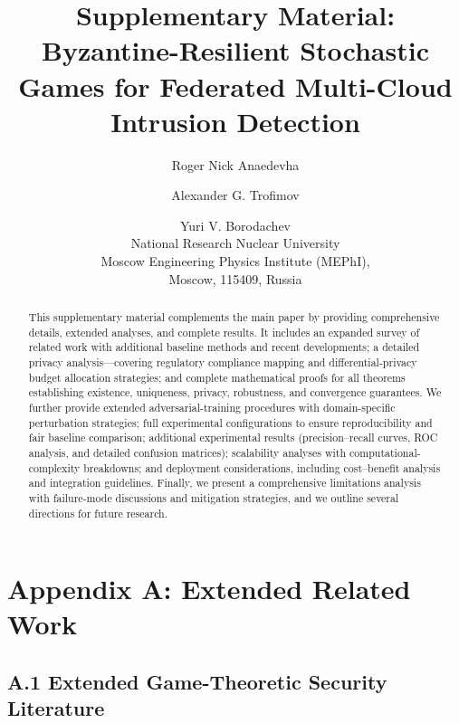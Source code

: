 \documentclass[12pt,a4paper]{article}
\theoremstyle{definition}
\begin{document}
\title{\textbf{Supplementary Material:\\Byzantine-Resilient Stochastic Games for Federated Multi-Cloud Intrusion Detection}}

\author{Roger Nick Anaedevha \and Alexander G. Trofimov \and Yuri V. Borodachev\\
\small National Research Nuclear University \\ 
\small Moscow Engineering Physics Institute (MEPhI), \\ 
\small Moscow, 115409, Russia}

\date{}
\maketitle

\begin{abstract}
This supplementary material complements the main paper by providing comprehensive details, extended analyses, and complete results. It includes an expanded survey of related work with additional baseline methods and recent developments; a detailed privacy analysis—covering regulatory compliance mapping and differential-privacy budget allocation strategies; and complete mathematical proofs for all theorems establishing existence, uniqueness, privacy, robustness, and convergence guarantees. We further provide extended adversarial-training procedures with domain-specific perturbation strategies; full experimental configurations to ensure reproducibility and fair baseline comparison; additional experimental results (precision–recall curves, ROC analysis, and detailed confusion matrices); scalability analyses with computational-complexity breakdowns; and deployment considerations, including cost–benefit analysis and integration guidelines. Finally, we present a comprehensive limitations analysis with failure-mode discussions and mitigation strategies, and we outline several directions for future research.
\end{abstract}


\tableofcontents
\clearpage

\section{Appendix A: Extended Related Work}

\subsection{A.1 Extended Game-Theoretic Security Literature}
\end{document}

